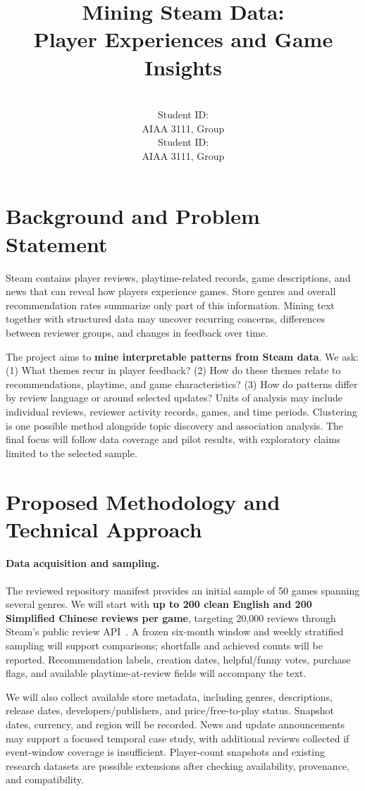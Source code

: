 \documentclass{article}
\title{Mining Steam Data:\\Player Experiences and Game Insights}
\author{%
  \MemberOneName\\
  Student ID: \MemberOneID\\
  AIAA 3111, Group \GroupNumber
  \And
  \MemberTwoName\\
  Student ID: \MemberTwoID\\
  AIAA 3111, Group \GroupNumber
}
\begin{document}
\maketitle

\section{Background and Problem Statement}
Steam contains player reviews, playtime-related records, game descriptions, and news that can reveal how players experience games. Store genres and overall recommendation rates summarize only part of this information. Mining text together with structured data may uncover recurring concerns, differences between reviewer groups, and changes in feedback over time.

The project aims to \textbf{mine interpretable patterns from Steam data}. We ask: (1) What themes recur in player feedback? (2) How do these themes relate to recommendations, playtime, and game characteristics? (3) How do patterns differ by review language or around selected updates? Units of analysis may include individual reviews, reviewer activity records, games, and time periods. Clustering is one possible method alongside topic discovery and association analysis. The final focus will follow data coverage and pilot results, with exploratory claims limited to the selected sample.

\section{Proposed Methodology and Technical Approach}
\paragraph{Data acquisition and sampling.}
The reviewed repository manifest provides an initial sample of 50 games spanning several genres. We will start with \textbf{up to 200 clean English and 200 Simplified Chinese reviews per game}, targeting 20,000 reviews through Steam's public review API~\cite{steam}. A frozen six-month window and weekly stratified sampling will support comparisons; shortfalls and achieved counts will be reported. Recommendation labels, creation dates, helpful/funny votes, purchase flags, and available playtime-at-review fields will accompany the text.

We will also collect available store metadata, including genres, descriptions, release dates, developers/publishers, and price/free-to-play status. Snapshot dates, currency, and region will be recorded. News and update announcements~\cite{news} may support a focused temporal case study, with additional reviews collected if event-window coverage is insufficient. Player-count snapshots and existing research datasets are possible extensions after checking availability, provenance, and compatibility.
\end{document}
